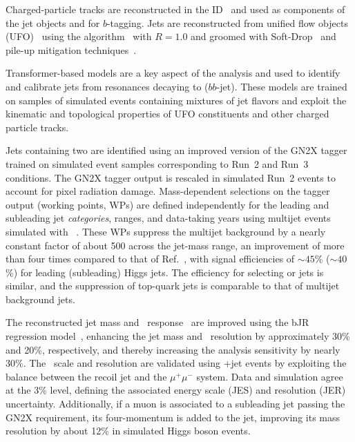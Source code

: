 \documentclass[PAPER, cernpreprint=true, atlasdraft=false, UKenglish, texmf, orcidlogo]{atlasdoc}
\begin{document}
Charged-particle tracks are reconstructed in the ID~\cite{IDTR-2022-04,ATL-PHYS-PUB-2019-015} and used as components of the jet objects and for $b$-tagging.
Jets are reconstructed from unified flow objects (UFO)~\cite{JETM-2018-06} using the \antikt algorithm~\cite{Cacciari:2008gp} with $R=1.0$ and groomed with Soft-Drop~\cite{Larkoski:2014wba,Dasgupta:2013ihk} and pile-up mitigation techniques~\cite{Berta:2014eza,Cacciari:2014gra}.

Transformer-based models are a key aspect of the analysis and used to identify and calibrate jets from resonances decaying to \bbbar ($bb$-jet). These models are trained on samples of simulated events containing mixtures of jet flavors and exploit the kinematic and topological properties of UFO constituents and other charged particle tracks.

Jets containing two \bhadrons are identified using an improved version of the GN2X tagger~\cite{ATL-PHYS-PUB-2023-021} trained on simulated event samples corresponding to Run~2 and Run~3 conditions.
The GN2X tagger output is rescaled in simulated Run~2 events to account for pixel radiation damage.
Mass-dependent selections on the tagger output (working points, WPs) are defined independently for the leading and subleading jet \textit{categories}, \pT ranges, and data-taking years using multijet events simulated with \PYTHIA[8]~\cite{ATL-PHYS-PUB-2019-017}.
These WPs suppress the multijet background by a nearly constant factor of about 500 across the jet-mass range, an improvement of more than four times compared to that of Ref.~\cite{HIGG-2021-08}, with signal efficiencies of $\sim45$\% ($\sim40$\%) for leading (subleading) Higgs jets.
The efficiency for selecting \Zbb or \Hbb jets is similar, and the suppression of top-quark jets is comparable to that of multijet background jets.

The reconstructed jet mass and \pT\ response~\cite{JETM-2018-02} are improved using the bJR regression model~\cite{ATL-PHYS-PUB-2024-015}, enhancing the jet mass and \pT\ resolution by approximately 30\% and 20\%, respectively, and thereby increasing the analysis sensitivity by nearly 30\%.
The \pT\ scale and resolution are validated using \Zmm+jet events by exploiting the balance between the recoil jet and the $\mu^{+}\mu^{-}$ system.
Data and simulation agree at the 3\% level, defining the associated energy scale (JES) and resolution (JER) uncertainty.
Additionally, if a muon is associated to a subleading jet passing the GN2X requirement, its four-momentum is added to the jet, improving its mass resolution by about 12\% in simulated Higgs boson events.
\end{document}
